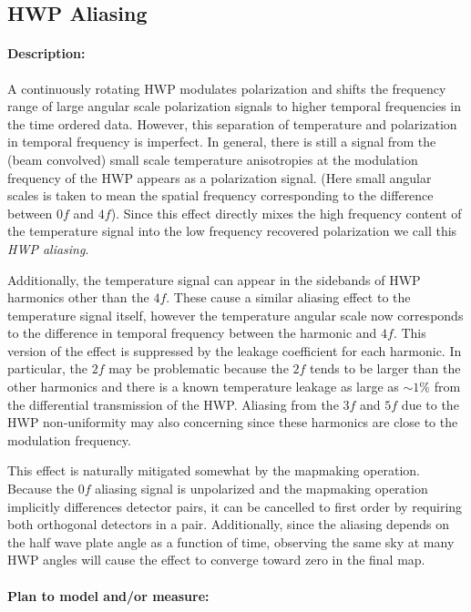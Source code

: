 \subsection{HWP Aliasing}

\paragraph{Description:}

A continuously rotating HWP modulates polarization and shifts the frequency range of large angular scale polarization signals to higher temporal frequencies in the time ordered data. However, this separation of temperature and polarization in temporal frequency is imperfect. In general, there is still a signal from the (beam convolved) small scale temperature anisotropies at the modulation frequency of the HWP appears as a polarization signal. (Here small angular scales is taken to mean the spatial frequency corresponding to the difference between $0f$ and $4f$). Since this effect directly mixes the high frequency content of the temperature signal into the low frequency recovered polarization we call this \emph{HWP aliasing}.

Additionally, the temperature signal can appear in the sidebands of HWP harmonics other than the $4f$. These cause a similar aliasing effect to the temperature signal itself, however the temperature angular scale now corresponds to the difference in temporal frequency between the harmonic and $4f$. This version of the effect is suppressed by the leakage coefficient for each harmonic. In particular, the $2f$ may be problematic because the $2f$ tends to be larger than the other harmonics and there is a known temperature leakage as large as $\sim 1\%$ from the differential transmission of the HWP. Aliasing from the $3f$ and $5f$ due to the HWP non-uniformity may also concerning since these harmonics are close to the modulation frequency.

This effect is naturally mitigated somewhat by the mapmaking operation. Because the $0f$ aliasing signal is unpolarized and the mapmaking operation implicitly differences detector pairs, it can be cancelled to first order by requiring both orthogonal detectors in a pair. Additionally, since the aliasing depends on the half wave plate angle as a function of time, observing the same sky at many HWP angles will cause the effect to converge toward zero in the final map.

\paragraph{Plan to model and/or measure:}

